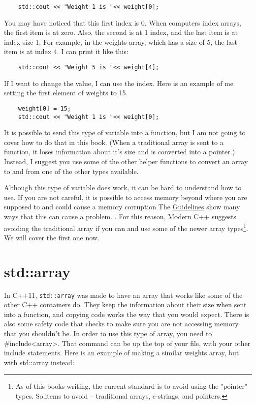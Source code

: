\begin{verbatim}
    std::cout << "Weight 1 is "<< weight[0];
\end{verbatim}
You may have noticed that this first index is 0. When computers index arrays, the first item is at zero. Also,
the second is at 1 index, and the last item is at index
size-1. For example, in the weights array, which has a size
of 5, the last item is at index 4. I can print it like this:
\begin{verbatim}
    std::cout << "Weight 5 is "<< weight[4];
\end{verbatim}
If I want to change the value, I can use the index. Here
is an example of me setting the first element of weights
to 15.
\begin{verbatim}
    weight[0] = 15;
    std::cout << "Weight 1 is "<< weight[0];
\end{verbatim}

It is possible to send this type of variable into a
function, but I am not going to cover how to do that
in this book. (When a traditional array is sent to a function, it loses information about it's size and is
converted into a pointer.) Instead, I suggest you use some of the
other helper functions to convert an array to and from
one of the other types available. 


Although this type of variable does work, it
can be hard to understand how to use. If you are not careful, 
it is possible to access memory beyond where you are supposed to and could cause a memory corruption
The \href{https://isocpp.github.io/CppCoreGuidelines/CppCoreGuidelines#p7-catch-run-time-errors-early}{Guidelines} show many ways that this can cause a problem. . For this reason, Modern C++ suggests avoiding the traditional array if you can and use some of the 
newer array types\footnote{As of this books writing, the current standard is to avoid using the "pointer" types. So,items to avoid -- traditional arrays, c-strings, and pointers.}. We will cover the first one now.

\section{std::array}
In C++11, {\tt std::array} was made to have an array that works like
some of the other C++ containers do. They keep the information about their size when sent into a function, and
copying code works the way that you would expect. There is
also some safety code that checks to make sure you are not 
accessing memory that you shouldn't be. In order to use this
type of array, you need to \#include<array>. That command can
be up the top of your file, with your other include statements. Here is an example of making a similar weights array, but with std::array instead:

